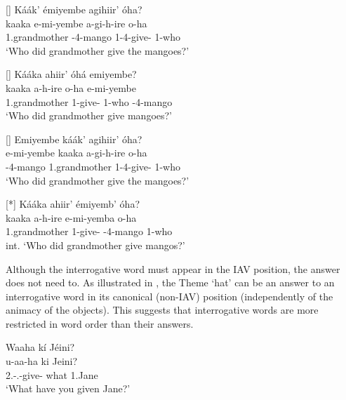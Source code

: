 \documentclass[output=paper]{langscibook}
\begin{document}
\z
\z

\ea
\label{bkm:Ref118704899}
\ea
[]{
\label{bkm:Ref118704899:a}
Káák’ émiyembe agihiir’ óha?\\
\gll
kaaka  e-mi-yembe  a-gi-h-ire  o-ha\\
1.grandmother  \AUG{}-4-mango  1\SM{}-4\OM{}-give-\PFV{}  1-who\\
\glt
‘Who did grandmother give the mangoes?’\\
}


\ex
[]{
\label{bkm:Ref118704899:b}
Kááka ahiir’ óhá emiyembe?\\
\gll
kaaka  a-h-ire  o-ha  e-mi-yembe\\
1.grandmother  1\SM{}-give-\PFV{}  1-who  \AUG{}-4-mango\\
\glt
‘Who did grandmother give mangoes?’\\
}

\ex
[]{
\label{bkm:Ref118704899:c}
Emiyembe káák’ agihiir’ óha?\\
\gll
e-mi-yembe  kaaka  a-gi-h-ire  o-ha\\
\AUG{}-4-mango  1.grandmother  1\SM{}-4\OM{}-give-\PFV{}  1-who\\
\glt
‘Who did grandmother give the mangoes?’\\
}


\ex
[*]{
\label{bkm:Ref118704899:d}
Kááka ahiir’ émiyemb’ óha?\\
\gll
kaaka  a-h-ire  e-mi-yemba  o-ha\\
1.grandmother  1\SM{}-give-\PFV{}  \AUG{}-4-mango  1-who\\
\glt
int. ‘Who did grandmother give mangos?’\\
}

\z
\z

Although the interrogative word must appear in the IAV position, the answer does not need to. As illustrated in , the Theme ‘hat’ can be an answer to an interrogative word in its canonical (non-IAV) position (independently of the animacy of the objects). This suggests that interrogative words are more restricted in word order than their answers.

\ea
\label{bkm:Ref113442937}
\ea
Waaha kí Jéini?\\
\gll
u-aa-ha  ki  Jeini?\\
2\SG{}.\SM{}-\N{}.\PST{}-give-\FV{}  what  1.Jane\\
\glt
‘What have you given Jane?’\\
\end{document}
